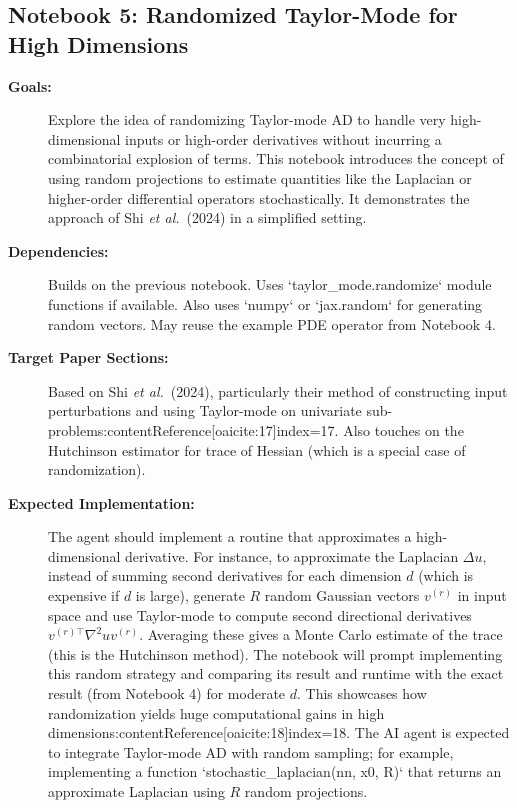 \documentclass[11pt]{article}
\begin{document}
\subsection{Notebook 5: Randomized Taylor-Mode for High Dimensions}
\begin{description}
  \item[\textbf{Goals:}] Explore the idea of randomizing Taylor-mode AD to handle very high-dimensional inputs or high-order derivatives without incurring a combinatorial explosion of terms. This notebook introduces the concept of using random projections to estimate quantities like the Laplacian or higher-order differential operators stochastically. It demonstrates the approach of Shi \textit{et al.}\ (2024) in a simplified setting.
  \item[\textbf{Dependencies:}] Builds on the previous notebook. Uses `taylor_mode.randomize` module functions if available. Also uses `numpy` or `jax.random` for generating random vectors. May reuse the example PDE operator from Notebook 4.
  \item[\textbf{Target Paper Sections:}] Based on Shi \textit{et al.}\ (2024), particularly their method of constructing input perturbations and using Taylor-mode on univariate sub-problems:contentReference[oaicite:17]{index=17}. Also touches on the Hutchinson estimator for trace of Hessian (which is a special case of randomization).
  \item[\textbf{Expected Implementation:}] The agent should implement a routine that approximates a high-dimensional derivative. For instance, to approximate the Laplacian $\Delta u$, instead of summing second derivatives for each dimension $d$ (which is expensive if $d$ is large), generate $R$ random Gaussian vectors $v^{(r)}$ in input space and use Taylor-mode to compute second directional derivatives $v^{(r)\top} \nabla^2 u v^{(r)}$. Averaging these gives a Monte Carlo estimate of the trace (this is the Hutchinson method). The notebook will prompt implementing this random strategy and comparing its result and runtime with the exact result (from Notebook 4) for moderate $d$. This showcases how randomization yields huge computational gains in high dimensions:contentReference[oaicite:18]{index=18}. The AI agent is expected to integrate Taylor-mode AD with random sampling; for example, implementing a function `stochastic_laplacian(nn, x0, R)` that returns an approximate Laplacian using $R$ random projections.
\end{description}
\end{document}
